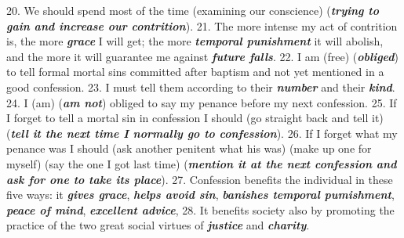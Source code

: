 \documentclass[a5paper]{article}
\newcommand\answer[1]{\textbf{\textit{#1}}}
\begin{document}
20. We should spend most of the time (examining our conscience) (\answer{trying to gain and increase our contrition}).
21. The more intense my act of contrition is, the more \answer{grace} I will get; the more \answer{temporal punishment} it will abolish, and the more it will guarantee me against \answer{future falls}.
22. I am (free) (\answer{obliged}) to tell formal mortal sins committed after baptism and not yet mentioned in a good confession.
23. I must tell them according to their \answer{number} and their \answer{kind}.
24. I (am) (\answer{am not}) obliged to say my penance before my next confession.
25. If I forget to tell a mortal sin in confession I should (go straight back and tell it) (\answer{tell it the next time I normally go to confession}).
26. If I forget what my penance was I should (ask another penitent what his was) (make up one for myself) (say the one I got last time) (\answer{mention it at the next confession and ask for one to take its place}).
27. Confession benefits the individual in these five ways: it \answer{gives grace}, \answer{helps avoid sin}, \answer{banishes temporal pumishment}, \answer{peace of mind}, \answer{excellent advice},
28. It benefits society also by promoting the practice of the two great social virtues of \answer{justice} and \answer{charity}.
\end{document}
